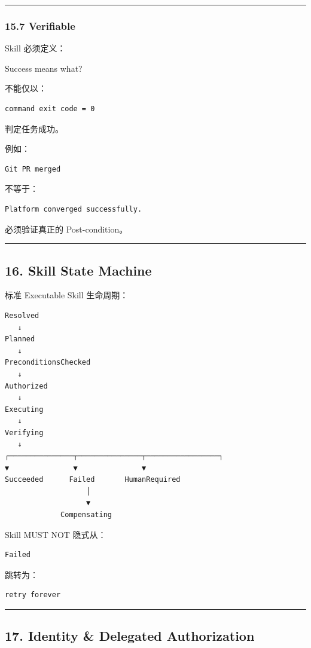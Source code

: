 \documentclass[11pt,a4paper]{article}
\begin{document}
\vspace{0.5em}\hrule\vspace{0.5em}
\subsubsection{15.7 Verifiable}
Skill 必须定义：

\begin{gfmBlockquote}
Success means what?
\end{gfmBlockquote}
不能仅以：

\begin{lstlisting}[language=text]
command exit code = 0
\end{lstlisting}
判定任务成功。

例如：

\begin{lstlisting}[language=text]
Git PR merged
\end{lstlisting}
不等于：

\begin{lstlisting}[language=text]
Platform converged successfully.
\end{lstlisting}
必须验证真正的 Post-condition。

\vspace{0.5em}\hrule\vspace{0.5em}
\subsection{16. Skill State Machine}
标准 Executable Skill 生命周期：

\begin{lstlisting}[language=text]
Resolved
   ↓
Planned
   ↓
PreconditionsChecked
   ↓
Authorized
   ↓
Executing
   ↓
Verifying
   ↓
┌───────────────┬───────────────┬─────────────────┐
▼               ▼               ▼
Succeeded      Failed       HumanRequired
                   │
                   ▼
             Compensating
\end{lstlisting}
Skill MUST NOT 隐式从：

\begin{lstlisting}[language=text]
Failed
\end{lstlisting}
跳转为：

\begin{lstlisting}[language=text]
retry forever
\end{lstlisting}
\vspace{0.5em}\hrule\vspace{0.5em}
\subsection{17. Identity \& Delegated Authorization}
\end{document}
